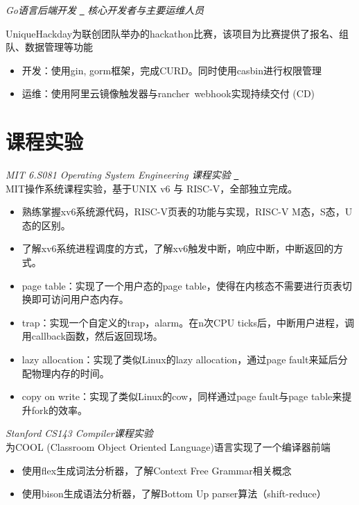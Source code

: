 \documentclass{uniquecv}
\begin{document}
\textit{Go语言后端开发}
\quad \href{https://github.com/colinaaa/UniqueHackDayDashboard-backend}{{\color{gray}{\faLink}}~}
\quad \emph{核心开发者与主要运维人员}
\vspace{0.4ex}

UniqueHackday为联创团队举办的hackathon比赛，该项目为比赛提供了报名、组队、数据管理等功能
\begin{itemize}
  \item 开发：使用gin, gorm框架，完成CURD。同时使用casbin进行权限管理
  \item 运维：使用阿里云镜像触发器与rancher\ webhook实现持续交付 (CD)
\end{itemize}

\section{课程实验}
{\it MIT 6.S081 Operating System Engineering 课程实验}
\quad \href{https://github.com/colinaaa/xv6-labs-2020}{{\color{gray}{\faLink}}~}
\vspace{0.4ex}
\\
MIT操作系统课程实验，基于UNIX v6 与 RISC-V，全部独立完成。
\begin{itemize}
  \item 熟练掌握xv6系统源代码，RISC-V页表的功能与实现，RISC-V M态，S态，U态的区别。
  \item 了解xv6系统进程调度的方式，了解xv6触发中断，响应中断，中断返回的方式。
  \item page table：实现了一个用户态的page table，使得在内核态不需要进行页表切换即可访问用户态内存。
  \item trap：实现一个自定义的trap，alarm。在n次CPU ticks后，中断用户进程，调用callback函数，然后返回现场。
  \item lazy allocation：实现了类似Linux的lazy allocation，通过page fault来延后分配物理内存的时间。
  \item copy on write：实现了类似Linux的cow，同样通过page fault与page table来提升fork的效率。
\end{itemize}

{\it Stanford CS143 Compiler课程实验}
\vspace{0.4ex}
\\
为COOL (Classroom Object Oriented Language)语言实现了一个编译器前端
\begin{itemize}
  \item 使用flex生成词法分析器，了解Context Free Grammar相关概念
  \item 使用bison生成语法分析器，了解Bottom Up parser算法（shift-reduce）
\end{itemize}
\end{document}
